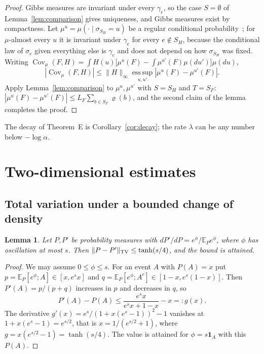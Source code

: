 \documentclass[aps,prd,twocolumn,superscriptaddress,nofootinbib,longbibliography,floatfix,amsmath,amssymb,10pt]{revtex4-2}
\newtheorem{lemma}[theorem]{Lemma}
\theoremstyle{definition}
\theoremstyle{remark}
\newcommand{\E}{\mathbb{E}}
\newcommand{\Cov}{\operatorname{Cov}}
\begin{document}
\begin{proof}
Gibbs measures are invariant under every $\gamma_e$, so the case
$S=\emptyset$ of Lemma~\ref{lem:comparison} gives uniqueness, and Gibbs
measures exist by compactness. Let $\mu^u=\mu(\cdot\mid\sigma_{S_H}=u)$ be a
regular conditional probability~\cite[Ch.~3]{Kal21}; for $\mu$-almost every
$u$ it is invariant under $\gamma_e$ for every $e\notin S_H$, because the
conditional law of $\sigma_e$ given everything else is $\gamma_e$ and does not
depend on how $\sigma_{S_H}$ was fixed. Writing
$\Cov_\mu(F,H)=\int H(u)\bigl[\mu^u(F)-\int\mu^{u'}(F)\mu(du')\bigr]\mu(du)$,
\[
|\Cov_\mu(F,H)|\le\|H\|_\infty\operatorname*{ess\,sup}_{u,u'}|\mu^u(F)-
\mu^{u'}(F)| .
\]
Apply Lemma~\ref{lem:comparison} to $\mu^u,\mu^{u'}$ with $S=S_H$ and
$T=S_F$: $|\mu^u(F)-\mu^{u'}(F)|\le L_F\sum_{b\in S_F}\varrho(b)$, and the
second claim of the lemma completes the proof.
\end{proof}

The decay of Theorem~E is Corollary~\ref{cor:decay}; the rate $\lambda$ can
be any number below $-\log\alpha$.

\section{Two-dimensional estimates}\label{app:twod}

\subsection{Total variation under a bounded change of density}

\begin{lemma}\label{lem:tanh}
Let $P,P'$ be probability measures with $dP'/dP=e^\phi/\E_Pe^\phi$, where
$\phi$ has oscillation at most $s$. Then $\|P-P'\|_{\rm TV}\le\tanh(s/4)$, and
the bound is attained.
\end{lemma}

\begin{proof}
We may assume $0\le\phi\le s$. For an event $A$ with $P(A)=x$ put
$p=\E_P[e^\phi;A]\in[x,e^sx]$ and $q=\E_P[e^\phi;A^c]\in[1-x,e^s(1-x)]$.
Then $P'(A)=p/(p+q)$ increases in $p$ and decreases in $q$, so
\[
P'(A)-P(A)\le\frac{e^sx}{e^sx+1-x}-x=:g(x).
\]
The derivative $g'(x)=e^s/(1+x(e^s-1))^2-1$ vanishes at $1+x(e^s-1)=
e^{s/2}$, that is $x=1/(e^{s/2}+1)$, where $g=x(e^{s/2}-1)=\tanh(s/4)$. The
value is attained for $\phi=s\mathbf 1_A$ with this $P(A)$.
\end{proof}
\end{document}
